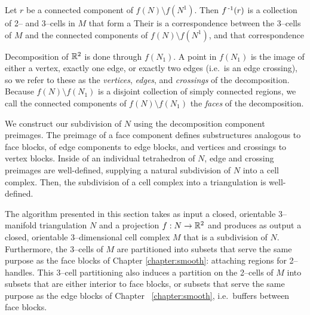 Let $r$ be a connected component of $f(N)\setminus f(N^1)$.
Then $f^{\,\text{-}1}(r)$ is a collection of 2-- and 3--cells in $M$ that form a  
Their is a correspondence between the 3--cells of $M$ and the connected components of $f(N)\setminus f(N^1)$, and that correspondence 

Decomposition of $\mathbb{R}^2$ is done through $f(N_1)$.
A point in $f(N_1)$ is the image of either a vertex, exactly one edge, or exactly two edges (i.e.\ is an edge crossing), so we refer to these as the \emph{vertices}, \emph{edges}, and \emph{crossings} of the decomposition.
Because $f(N)\setminus f(N_1)$  is a disjoint collection of simply connected regions, we call the connected components of $f(N)\setminus f(N_1)$ the \emph{faces} of the decomposition.

We construct our subdivision of $N$ using the decomposition component preimages.
The preimage of a face component defines substructures analogous to face blocks, of edge components to edge blocks, and vertices and crossings to vertex blocks.
Inside of an individual tetrahedron of $N$, edge and crossing preimages are well-defined, supplying a natural subdivision of $N$ into a cell complex.
Then, the subdivision of a cell complex into a triangulation is well-defined.

The algorithm presented in this section takes as input a closed, orientable 3--manifold triangulation $N$ and a projection $f:N\to\mathbb{R}^2$ and produces as output a closed, orientable 3--dimensional cell complex $M$ that is a subdivision of $N$.
Furthermore, the 3--cells of $M$ are partitioned into subsets that serve the same purpose as the face blocks of Chapter \ref{chapter:smooth}: attaching regions for 2--handles.
This 3--cell partitioning also induces a partition on the 2--cells of $M$ into subsets that are either interior to face blocks, or subsets that serve the same purpose as the edge blocks of Chapter ~\ref{chapter:smooth}, i.e.\ buffers between face blocks.





